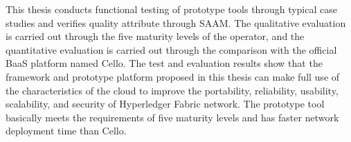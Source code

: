\documentclass[macfonts,master,oneside]{njuthesis}
\begin{document}
\begin{englishabstract}
  This thesis conducts functional testing of prototype tools through typical case studies and verifies quality attribute through SAAM. The qualitative evaluation is carried out through the five maturity levels of the operator, and the quantitative evaluation is carried out through the comparison with the official BaaS platform named Cello. The test and evaluation results show that the framework and prototype platform proposed in this thesis can make full use of the characteristics of the cloud to improve the portability, reliability, usability, scalability, and security of Hyperledger Fabric network. The prototype tool basically meets the requirements of five maturity levels and has faster network deployment time than Cello.
  
\end{englishabstract}


%
%
%
%

\tableofcontents

\listoffigures

\listoftables

\mainmatter






\end{document}
